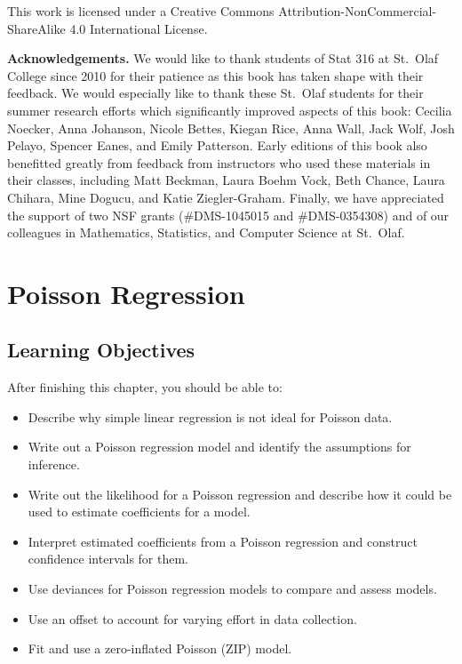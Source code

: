 \documentclass[
]{krantz}
\providecommand{\tightlist}{%
  \setlength{\itemsep}{0pt}\setlength{\parskip}{0pt}}
\begin{document}
This work is licensed under a Creative Commons Attribution-NonCommercial-ShareAlike 4.0 International License.

\textbf{Acknowledgements.} We would like to thank students of Stat 316 at St.~Olaf College since 2010 for their patience as this book has taken shape with their feedback. We would especially like to thank these St.~Olaf students for their summer research efforts which significantly improved aspects of this book: Cecilia Noecker, Anna Johanson, Nicole Bettes, Kiegan Rice, Anna Wall, Jack Wolf, Josh Pelayo, Spencer Eanes, and Emily Patterson. Early editions of this book also benefitted greatly from feedback from instructors who used these materials in their classes, including Matt Beckman, Laura Boehm Vock, Beth Chance, Laura Chihara, Mine Dogucu, and Katie Ziegler-Graham. Finally, we have appreciated the support of two NSF grants (\#DMS-1045015 and \#DMS-0354308) and of our colleagues in Mathematics, Statistics, and Computer Science at St.~Olaf.

\hypertarget{ch-poissonreg}{%
\chapter{Poisson Regression}\label{ch-poissonreg}}

\hypertarget{learning-objectives}{%
\section{Learning Objectives}\label{learning-objectives}}

After finishing this chapter, you should be able to:

\begin{itemize}
\tightlist
\item
  Describe why simple linear regression is not ideal for Poisson data.
\item
  Write out a Poisson regression model and identify the assumptions for inference.
\item
  Write out the likelihood for a Poisson regression and describe how it could be used to estimate coefficients for a model.
\item
  Interpret estimated coefficients from a Poisson regression and construct confidence intervals for them.
\item
  Use deviances for Poisson regression models to compare and assess models.
\item
  Use an offset to account for varying effort in data collection.
\item
  Fit and use a zero-inflated Poisson (ZIP) model.
\end{itemize}
\end{document}
